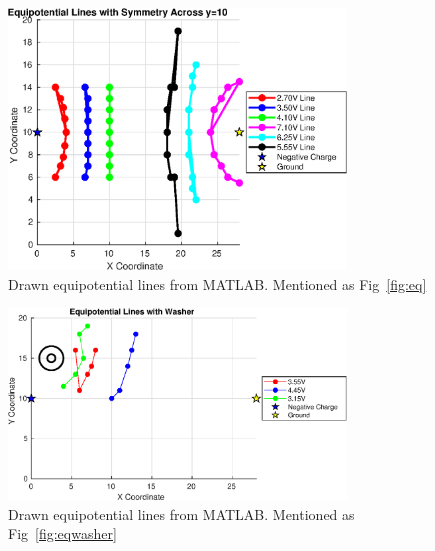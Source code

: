 \documentclass[11pt]{article}
\begin{document}
\begin{figure}[H]
\centering
\includegraphics[width=0.8\textwidth]{EquipotentialLines.eps}
\caption{Drawn equipotential lines from MATLAB. Mentioned as Fig~\ref{fig:eq}}
\end{figure}

\begin{figure}[H]
\centering
\includegraphics[width=0.8\textwidth]{EquipotentialLinesWithWasher.eps}
\caption{Drawn equipotential lines from MATLAB. Mentioned as Fig~\ref{fig:eqwasher}}
\end{figure}
\end{document}
